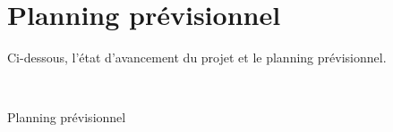 \chapter{Planning pr{\'e}visionnel}

Ci-dessous, l'{\'e}tat d'avancement du projet et le planning pr{\'e}visionnel.\\

\begin{center}
\\
\par{Planning pr{\'e}visionnel}
\end{center}